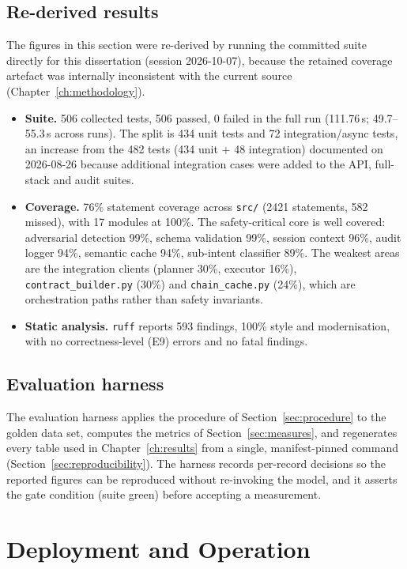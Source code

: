 \subsection*{Re-derived results}

The figures in this section were re-derived by running the committed suite
directly for this dissertation (session 2026-10-07), because the retained
coverage artefact was internally inconsistent with the current source
(Chapter~\ref{ch:methodology}).

\begin{itemize}
\item \textbf{Suite.} 506 collected tests, 506 passed, 0 failed in the full
run (111.76\,s; 49.7--55.3\,s across runs). The split is 434 unit tests and 72
integration/async tests, an increase from the 482 tests (434 unit + 48
integration) documented on 2026-08-26 because additional integration cases were
added to the API, full-stack and audit suites.
\item \textbf{Coverage.} 76\% statement coverage across \texttt{src/} (2421
statements, 582 missed), with 17 modules at 100\%. The safety-critical core is
well covered: adversarial detection 99\%, schema validation 99\%, session
context 96\%, audit logger 94\%, semantic cache 94\%, sub-intent classifier
89\%. The weakest areas are the integration clients (planner 30\%, executor
16\%), \texttt{contract\_builder.py} (30\%) and \texttt{chain\_cache.py}
(24\%), which are orchestration paths rather than safety invariants.
\item \textbf{Static analysis.} \texttt{ruff} reports 593 findings, 100\%
style and modernisation, with no correctness-level (E9) errors and no fatal
findings.
\end{itemize}

\subsection*{Evaluation harness}

The evaluation harness applies the procedure of
Section~\ref{sec:procedure} to the golden data set, computes the metrics of
Section~\ref{sec:measures}, and regenerates every table used in
Chapter~\ref{ch:results} from a single, manifest-pinned command
(Section~\ref{sec:reproducibility}). The harness records per-record decisions
so the reported figures can be reproduced without re-invoking the model, and
it asserts the gate condition (suite green) before accepting a measurement.


\section{Deployment and Operation}\label{sec:deployment-operation}

